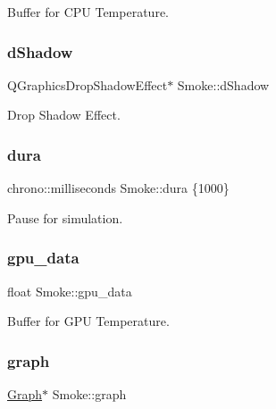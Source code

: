 Buffer for C\+PU Temperature. 

\mbox{\label{classSmoke_a26f011df30f860db285ef97713ca7989}} 
\subsubsection{\texorpdfstring{dShadow}{dShadow}}
{\footnotesize\ttfamily Q\+Graphics\+Drop\+Shadow\+Effect$\ast$ Smoke\+::d\+Shadow\hspace{0.3cm}{\ttfamily [private]}}



Drop Shadow Effect. 

\mbox{\label{classSmoke_ae62660aa3919c7a01b5a0c3ad5ec1715}} 
\subsubsection{\texorpdfstring{dura}{dura}}
{\footnotesize\ttfamily chrono\+::milliseconds Smoke\+::dura \{1000\}\hspace{0.3cm}{\ttfamily [private]}}



Pause for simulation. 

\mbox{\label{classSmoke_afcd49fb97c3573ec4c779346d4be1c95}} 
\subsubsection{\texorpdfstring{gpu\_data}{gpu\_data}}
{\footnotesize\ttfamily float Smoke\+::gpu\+\_\+data\hspace{0.3cm}{\ttfamily [private]}}



Buffer for G\+PU Temperature. 

\mbox{\label{classSmoke_a7a2faa3ba32e51c7eb4212622f31ed79}} 
\subsubsection{\texorpdfstring{graph}{graph}}
{\footnotesize\ttfamily \mbox{\hyperlink{classGraph}{Graph}}$\ast$ Smoke\+::graph\hspace{0.3cm}{\ttfamily [private]}}



